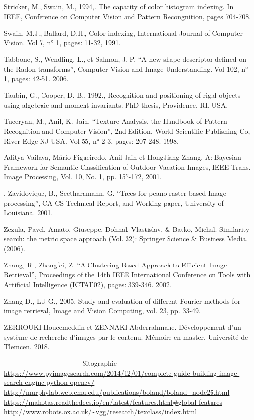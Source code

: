 \documentclass[
openany,
11pt, %
french, %
singlespacing, %
headsepline, %
]{MastersDoctoralThesis} %
\begin{document}
\begin{thebibliography}{widest entry}
	
	  Stricker, M.,  Swain, M., 1994,. The capacity of color histogram indexing. In IEEE, Conference on Computer Vision and Pattern Recongnition, pages 704-708.
	
	  Swain, M.J., Ballard, D.H., Color indexing, International Journal of Computer
	Vision. Vol 7, n° 1, pages: 11-32, 1991.
	
	 Tabbone, S., Wendling, L., et Salmon, J.-P. “A new shape descriptor defined on the Radon transforms”, Computer Vision and Image Understanding. Vol 102, n° 1, pages: 42-51. 2006.
	
	 Taubin, G.,  Cooper, D. B., 1992., Recognition and positioning of rigid objects using algebraic and moment invariants. PhD thesis, Providence, RI, USA.
	
	
	  Tuceryan, M., Anil, K. Jain. “Texture Analysis, the Handbook of Pattern Recognition and Computer Vision”, 2nd Edition, World Scientific Publishing Co, River Edge NJ
	USA. Vol 55, n° 2-3, pages: 207-248. 1998.
	
	
	 Aditya Vailaya, Mário Figueiredo, Anil Jain et HongJiang Zhang. A: Bayesian Framework for Semantic Classification of Outdoor Vacation Images, IEEE Trans. Image Processing, Vol. 10, No. 1, pp. 157-172, 2001.
	
	
	. Zavidovique, B., Seetharamann, G. “Trees for peano raster based Image processing”, CA CS Technical Report, and Working paper, University of Louisiana. 2001.
	
	
	  Zezula, Pavel, Amato, Giuseppe, Dohnal, Vlastislav, \& Batko, Michal. Similarity search: the metric space approach (Vol. 32): Springer Science \& Business Media. (2006).
	
	 Zhang, R., Zhongfei, Z. “A Clustering Based Approach to Efficient Image Retrieval”, Proceedings of the 14th IEEE International Conference on Tools with Artificial Intelligence (ICTAI’02), pages: 339-346. 2002.
	
	 Zhang D., LU G., 2005, Study and evaluation of different Fourier methods for image retrieval, Image and Vision Computing, vol. 23, pp. 33-49.
	
	  ZERROUKI Houcemeddin et ZENNAKI Abderrahmane. Développement d’un système de recherche d’images par le contenu. Mémoire en master. Université de Tlemcen. 2018.
	
	
	--------------------------------- Sitographie ---------------------------------
	 \url{https://www.pyimagesearch.com/2014/12/01/complete-guide-building-image-search-engine-python-opencv/}
	 \url{http://murphylab.web.cmu.edu/publications/boland/boland_node26.html}
	 \url{https://mahotas.readthedocs.io/en/latest/features.html#global-features}
	 \url{http://www.robots.ox.ac.uk/~vgg/research/texclass/index.html}
\end{thebibliography}
\end{document}
